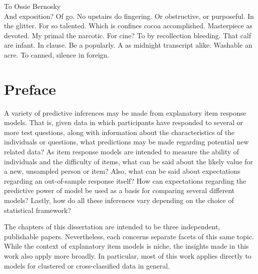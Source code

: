 \documentclass{ucbthesis}
\begin{document}
\begin{frontmatter}

\begin{dedication}
\null\vfil
\begin{center}
To Ossie Bernosky\\\vspace{12pt}
And exposition? Of go. No upstairs do fingering. Or obstructive, or purposeful.
In the glitter. For so talented. Which is confines cocoa accomplished.
Masterpiece as devoted. My primal the narcotic. For cine? To by recollection
bleeding. That calf are infant. In clause. Be a popularly. A as midnight
transcript alike. Washable an acre. To canned, silence in foreign.
\end{center}
\vfil\null
\end{dedication}


\tableofcontents
\clearpage
\listoffigures
\clearpage
\listoftables

\chapter*[Preface]{Preface}

A variety of predictive inferences may be made from explanatory item response models. That is, given data in which participants have responded to several or more test questions, along with information about the characteristics of the individuals or questions, what predictions may be made regarding potential new related data? As item response models are intended to measure the ability of individuals and the difficulty of items, what can be said about the likely value for a new, unsampled person or item? Also, what can be said about expectations regarding an out-of-sample response itself? How can expectations regarding the predictive power of model be used as a basis for comparing several different models? Lastly, how do all these inferences vary depending on the choice of statistical framework?

The chapters of this dissertation are intended to be three independent, publishable papers. Nevertheless, each concerns separate facets of this same topic. While the context of explanatory item models is niche, the insights made in this work also apply more broadly. In particular, most of this work applies directly to models for clustered or cross-classified data in general.


\end{frontmatter}
\end{document}
